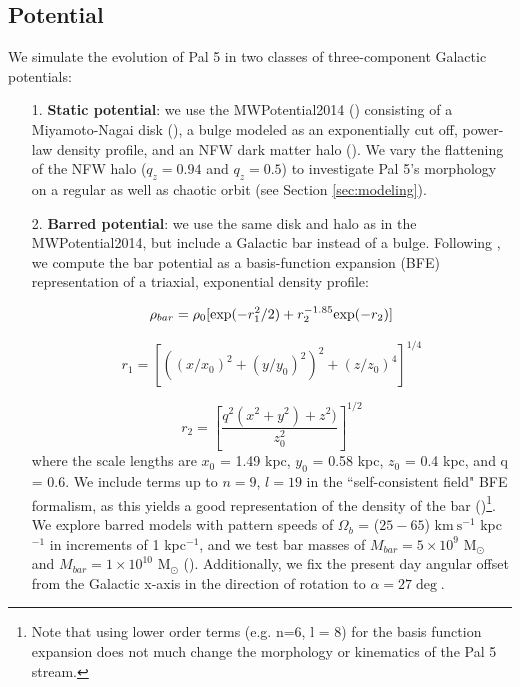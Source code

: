 \documentclass[twocolumn]{aastex62}
\newcommand{\msun}{\textrm{M}_\odot}
\newcommand{\kms}{\ensuremath{\textrm{km}~\textrm{s}^{-1}}}
\begin{document}
\subsection{Potential}
\label{sec:potential}
We simulate the evolution of Pal 5 in two classes of three-component Galactic potentials:

\begin{itemize}
\item[1.] {\bf Static potential}: we use the {\small MWPotential2014} (\citealt{Bovy:2015}) consisting of a Miyamoto-Nagai disk (\citealt{Miyamoto:1975}), a bulge modeled as an exponentially cut off, power-law density profile, and an NFW dark matter halo (\citealt{Navarro:1996}).
We vary the flattening of the NFW halo ($q_z = 0.94$ and $q_z = 0.5$) to investigate Pal 5's morphology on a regular as well as chaotic orbit (see Section \ref{sec:modeling}).

\item[2.] {\bf  Barred potential}: we use the same disk and halo as in the {\small MWPotential2014}, but include a Galactic bar instead of a bulge.
Following \citet{wang:2012}, we compute the bar potential as a basis-function expansion (BFE) representation of a triaxial, exponential density profile:

\begin{equation}
\rho_{bar} = \rho_0 [{\rm exp} (-r^2_1/2) + r_2^{-1.85} {\rm exp}(-r_2) ]
\end{equation}

\begin{equation}
r_1 = \left[\left((x/x_0)^2 + (y/y_0)^2\right)^2 +( z/z_0)^4\right]^{1/4}
\end{equation}

\begin{equation}
r_2 = \left[\frac{q^2(x^2 + y^2) + z^2)}{z_0^2}\right]^{1/2}
\end{equation}
where the scale lengths are $x_0$ = 1.49 kpc, $y_0$ = 0.58 kpc, $z_0$ = 0.4 kpc, and q = 0.6. We include terms up to $n=9$, $l=19$ in the ``self-consistent field" BFE formalism, as this yields a good representation of the density of the bar (\citealt{Banik:2019})\footnote{Note that using lower order terms (e.g. n=6, l = 8) for the basis function expansion does not much change the morphology or kinematics of the Pal 5 stream.}.
We explore barred models with pattern speeds of $\Omega_b$ = ($25 - 65$) $\kms$ kpc$^{-1}$ in increments of 1 kpc$^{-1}$, and  we test bar masses of $M_{bar} = 5 \times 10^{9}$ $\msun$ and $M_{bar} = 1 \times 10^{10}$ $\msun$ (\citealt{Portail:2017}).
Additionally, we fix the present day angular offset from the Galactic x-axis in the direction of rotation to $\alpha = 27\deg$.
\end{itemize}
\end{document}
